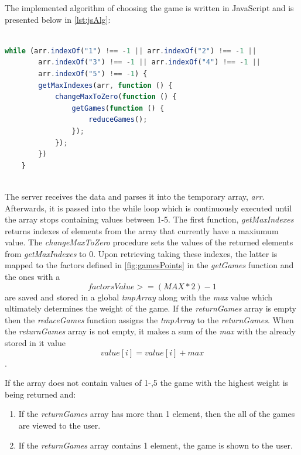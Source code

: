 The implemented algorithm of choosing the game is written in JavaScript and is presented below in \autoref{lst:jsAlg}:

\begin{lstlisting}[float=ht,escapechar=@,
    language=JavaScript,
    caption={The algorithm of choosing the game in JavaScript},
    label={lst:jsAlg},
    basicstyle=\ttfamily,
    keywordstyle=\color{blue}\ttfamily,
    stringstyle=\color{red}\ttfamily,
    captionpos=b,
    aboveskip=20pt,
    frame=trbl]

while (arr.indexOf("1") !== -1 || arr.indexOf("2") !== -1 ||
        arr.indexOf("3") !== -1 || arr.indexOf("4") !== -1 || 
        arr.indexOf("5") !== -1) {
        getMaxIndexes(arr, function () {
            changeMaxToZero(function () {
                getGames(function () {
                    reduceGames();
                });
            });
        })
    }
    
\end{lstlisting}

The server receives the data and parses it into the temporary array, \textit{arr}. Afterwards, it is passed into the while loop which is continuously executed until the array stops containing values between 1-5. The first function, \textit{getMaxIndexes} returns indexes of elements from the array that currently have a maxiumum value. The \textit{changeMaxToZero} procedure sets the values of the returned elements from  \textit{getMaxIndexes} to 0. Upon retrieving taking these indexes, the latter is mapped to the factors defined in \autoref{fig:gamesPoints} in the \textit{getGames} function and the ones with a
\[factorsValue >= (MAX * 2) - 1\]
are saved and stored in a global \textit{tmpArray} along with the \textit{max} value which ultimately determines the weight of the game. If the \textit{returnGames} array is empty then the \textit{reduceGames} function assigns the \textit{tmpArray} to the \textit{returnGames}. When the \textit{returnGames} array is not empty, it makes a sum of the \textit{max} with the already stored in it value
\[value[i] = value[i] + max  \].

If the array does not contain values of 1-,5 the game with the highest weight is being returned and:
\begin{enumerate}
    \item If the \textit{returnGames} array has more than 1 element, then the all of the games are viewed to the user.
    \item If the \textit{returnGames} array contains 1 element, the game is shown to the user.
\end{enumerate}

